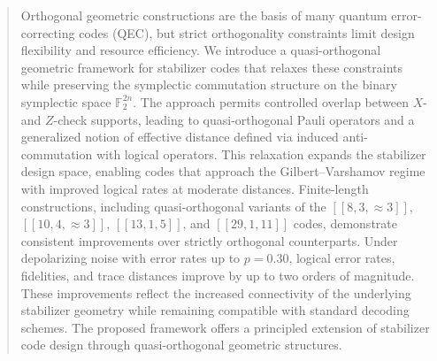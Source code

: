 \documentclass{iopjournal}
\theoremstyle{thmstyleone}%
\theoremstyle{thmstyletwo}%
\theoremstyle{thmstylethree}%
\begin{document}
\begin{abstract}

Orthogonal geometric constructions are the basis of many quantum error-correcting codes (QEC), but strict orthogonality constraints limit design flexibility and resource efficiency. We introduce a quasi-orthogonal geometric framework for stabilizer codes that relaxes these constraints while preserving the symplectic commutation structure on the binary symplectic space  \(\mathbb{F}_2^{2n}\). The approach permits controlled overlap between $X$- and $Z$-check supports, leading to quasi-orthogonal Pauli operators and a generalized notion of effective distance defined via induced anti-commutation with logical operators. This relaxation expands the stabilizer design space, enabling codes that approach the Gilbert–Varshamov regime with improved logical rates at moderate distances. Finite-length constructions, including quasi-orthogonal variants of the $[[8,3,\approx 3]]$, $[[10,4,\approx 3]]$, $[[13,1,5]]$, and $[[29,1,11]]$ codes, demonstrate consistent improvements over strictly orthogonal counterparts. Under depolarizing noise with error rates up to $p = 0.30$, logical error rates, fidelities, and trace distances improve by up to two orders of magnitude. These improvements reflect the increased connectivity of the underlying stabilizer geometry while remaining compatible with standard decoding schemes. The proposed framework offers a principled extension of stabilizer code design through quasi-orthogonal geometric structures.


\end{abstract}
\end{document}
